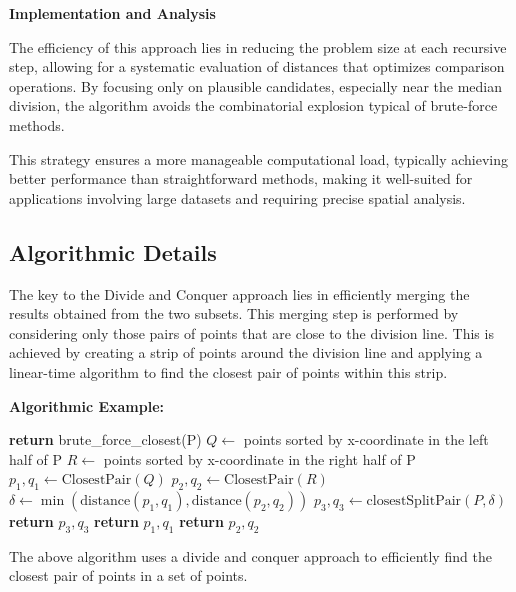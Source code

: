 \documentclass[12pt]{book} %
\begin{document}
\textbf{Implementation and Analysis}

The efficiency of this approach lies in reducing the problem size at each recursive step, allowing for a systematic evaluation of distances that optimizes comparison operations. By focusing only on plausible candidates, especially near the median division, the algorithm avoids the combinatorial explosion typical of brute-force methods.

This strategy ensures a more manageable computational load, typically achieving better performance than straightforward methods, making it well-suited for applications involving large datasets and requiring precise spatial analysis.


\subsection{Algorithmic Details}

The key to the Divide and Conquer approach lies in efficiently merging the results obtained from the two subsets. This merging step is performed by considering only those pairs of points that are close to the division line. This is achieved by creating a strip of points around the division line and applying a linear-time algorithm to find the closest pair of points within this strip.


\textbf{Algorithmic Example:}
\FloatBarrier
\begin{algorithm}
\caption{Closest Pair of Points}
\begin{algorithmic}[1]
    \State \textbf{return} brute\_force\_closest(P)
\EndIf
\State $Q \gets$ points sorted by x-coordinate in the left half of P
\State $R \gets$ points sorted by x-coordinate in the right half of P
\State $p_1, q_1 \gets \text{ClosestPair}(Q)$
\State $p_2, q_2 \gets \text{ClosestPair}(R)$
\State $\delta \gets \min(\text{distance}(p_1, q_1), \text{distance}(p_2, q_2))$
\State $p_3, q_3 \gets \text{closestSplitPair}(P, \delta)$
    \State \textbf{return} $p_3, q_3$
\Else
        \State \textbf{return} $p_1, q_1$
    \Else
        \State \textbf{return} $p_2, q_2$
    \EndIf
\EndIf
\EndFunction
\end{algorithmic}
\end{algorithm}
\FloatBarrier
The above algorithm uses a divide and conquer approach to efficiently find the closest pair of points in a set of points.
\end{document}
